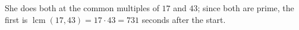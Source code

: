 She does both at the common multiples of $17$ and $43$; since both are prime, the first is $\operatorname{lcm}(17,43)=17\cdot43=\boxed{731}$ seconds after the start.
